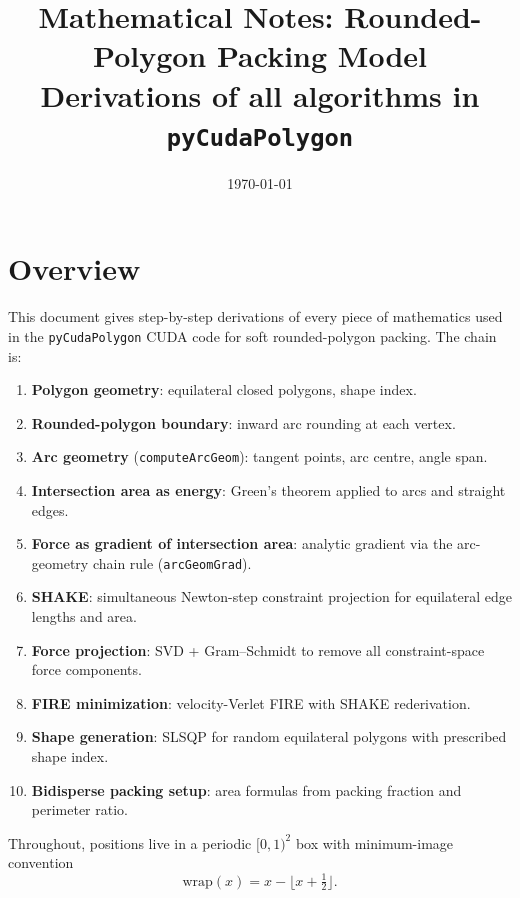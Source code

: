 \documentclass[12pt]{article}
\title{\textbf{Mathematical Notes: Rounded-Polygon Packing Model}\\[0.5em]
\large Derivations of all algorithms in \texttt{pyCudaPolygon}}
\author{}
\date{\today}
\begin{document}
\maketitle
\tableofcontents
\newpage

\section{Overview}

This document gives step-by-step derivations of every piece of
mathematics used in the \texttt{pyCudaPolygon} CUDA code for
soft rounded-polygon packing.  The chain is:

\begin{enumerate}
  \item \textbf{Polygon geometry}: equilateral closed polygons, shape index.
  \item \textbf{Rounded-polygon boundary}: inward arc rounding at each vertex.
  \item \textbf{Arc geometry} (\texttt{computeArcGeom}): tangent points,
        arc centre, angle span.
  \item \textbf{Intersection area as energy}: Green's theorem applied to arcs
        and straight edges.
  \item \textbf{Force as gradient of intersection area}: analytic gradient
        via the arc-geometry chain rule (\texttt{arcGeomGrad}).
  \item \textbf{SHAKE}: simultaneous Newton-step constraint projection for
        equilateral edge lengths and area.
  \item \textbf{Force projection}: SVD + Gram–Schmidt to remove all
        constraint-space force components.
  \item \textbf{FIRE minimization}: velocity-Verlet FIRE with SHAKE rederivation.
  \item \textbf{Shape generation}: SLSQP for random equilateral polygons with
        prescribed shape index.
  \item \textbf{Bidisperse packing setup}: area formulas from packing fraction
        and perimeter ratio.
\end{enumerate}

Throughout, positions live in a periodic $[0,1)^2$ box with minimum-image convention
\[
  \mathrm{wrap}(x) = x - \lfloor x + \tfrac{1}{2} \rfloor.
\]

\end{document}
